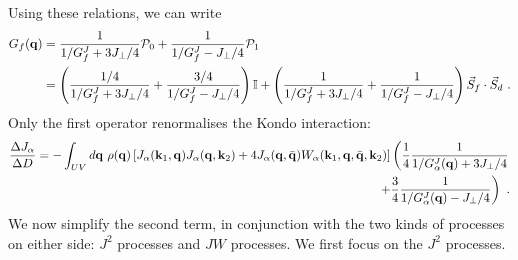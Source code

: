 \documentclass[%
reprint,
superscriptaddress,
groupedaddress,
superscriptaddress,
onecolumn,
10pt
]{revtex4-2}
\begin{document}
Using these relations, we can write
\begin{equation}\begin{aligned}\label{expandedGreensFunction}
	G_f({\bf q}) &= \frac{1}{1/G_f^J + 3J_\perp/4}\mathcal{P}_0 + \frac{1}{1/G_f^J - J_\perp/4}\mathcal{P}_1 \\
		&= \left(\frac{1/4}{1/G_f^J + 3J_\perp/4} + \frac{3/4}{1/G_f^J - J_\perp/4}\right)\mathbb{I} + \left(\frac{1}{1/G_f^J + 3J_\perp/4} + \frac{1}{1/G_f^J - J_\perp/4}\right)\vec{S}_f\cdot\vec{S}_d~.
\end{aligned}\end{equation}
Only the first operator renormalises the Kondo interaction:
\begin{equation}\begin{aligned}\label{kondoRenormalisation}
	\frac{\Delta J_\alpha}{\Delta D} = -\int_{UV} d{\bf q} ~\rho({\bf q}) \left[J_\alpha({\bf k}_1, {\bf q})J_\alpha({\bf q}, {\bf k}_2) + 4J_\alpha({\bf q}, \bar {\bf q})W_\alpha({\bf k}_1, {\bf q}, \bar {\bf q}, {\bf k}_2)\right]\left(\frac{1}{4}\frac{1}{1/G_\alpha^J({\bf q}) + 3J_\perp/4}\right.\\
																																																										   \left. + \frac{3}{4}\frac{1}{1/G_\alpha^J({\bf q}) - J_\perp/4}\right)~.
\end{aligned}\end{equation}
We now simplify the second term, in conjunction with the two kinds of processes on either side: \(J^2\) processes and \(JW\) processes. We first focus on the \(J^2\) processes. 
\end{document}
